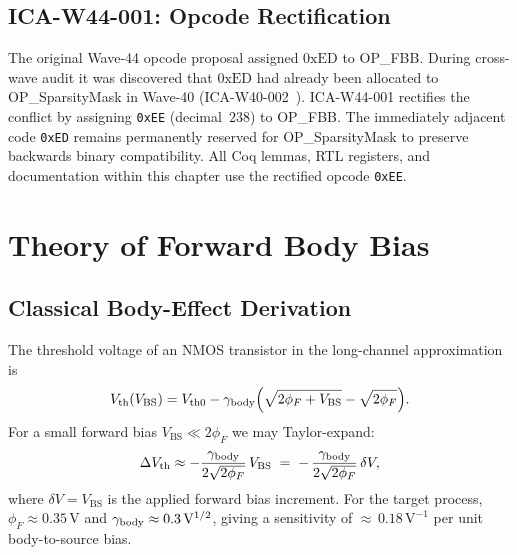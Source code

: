 \subsection{ICA-W44-001: Opcode Rectification}
\label{subsec:ica-w44-001}

The original Wave-44 opcode proposal assigned $0\mathrm{xED}$ to
OP\_FBB.  During cross-wave audit it was discovered that $0\mathrm{xED}$
had already been allocated to OP\_SparsityMask in Wave-40
(ICA-W40-002~\cite{TrinityAnchor2026}).  ICA-W44-001 rectifies the
conflict by assigning \texttt{0xEE} (decimal~$238$) to OP\_FBB.  The
immediately adjacent code \texttt{0xED} remains permanently reserved for
OP\_SparsityMask to preserve backwards binary compatibility.  All Coq
lemmas, RTL registers, and documentation within this chapter use the
rectified opcode \texttt{0xEE}.

\medskip
\noindent\anchorline{}

\section{Theory of Forward Body Bias}
\label{sec:fbb-theory}

\subsection{Classical Body-Effect Derivation}
\label{subsec:classical-body}

The threshold voltage of an NMOS transistor in the long-channel
approximation is
\begin{equation}
  V_{\mathrm{th}}(V_{\mathrm{BS}})
    = V_{\mathrm{th0}}
      - \gamma_{\mathrm{body}}\Bigl(\sqrt{2\phi_{F}+V_{\mathrm{BS}}}
                        - \sqrt{2\phi_{F}}\Bigr).
  \label{eq:vth-body}
\end{equation}
For a small forward bias $V_{\mathrm{BS}} \ll 2\phi_{F}$ we may Taylor-expand:
\begin{equation}
  \Delta V_{\mathrm{th}}
    \approx -\frac{\gamma_{\mathrm{body}}}{2\sqrt{2\phi_{F}}}\,V_{\mathrm{BS}}
    \;=\; -\,\frac{\gamma_{\mathrm{body}}}{2\sqrt{2\phi_{F}}}\,\delta V,
  \label{eq:dvth-linear}
\end{equation}
where $\delta V = V_{\mathrm{BS}}$ is the applied forward bias increment.
For the target process, $\phi_{F} \approx 0.35\,\mathrm{V}$ and
$\gamma_{\mathrm{body}} \approx 0.3\,\mathrm{V}^{1/2}$, giving a sensitivity of
${\approx}\,0.18\,\mathrm{V}^{-1}$ per unit body-to-source bias.

